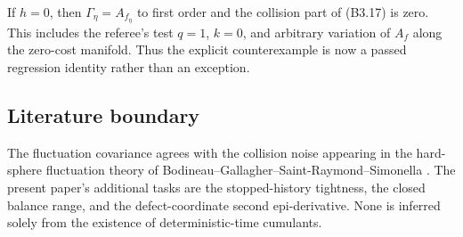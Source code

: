 If $h=0$, then $\Gamma_\eta=A_{f_\eta}$ to first order and the collision part
of (B3.17) is zero.  This includes the referee's test $q=1$, $k=0$, and
arbitrary variation of $A_f$ along the zero-cost manifold.  Thus the explicit
counterexample is now a passed regression identity rather than an exception.

\subsection{Literature boundary}

The fluctuation covariance agrees with the collision noise appearing in the
hard-sphere fluctuation theory of
Bodineau--Gallagher--Saint-Raymond--Simonella \cite{BGSS2023}.  The present
paper's additional tasks are the stopped-history tightness, the closed
balance range, and the defect-coordinate second epi-derivative.  None is
inferred solely from the existence of deterministic-time cumulants.
